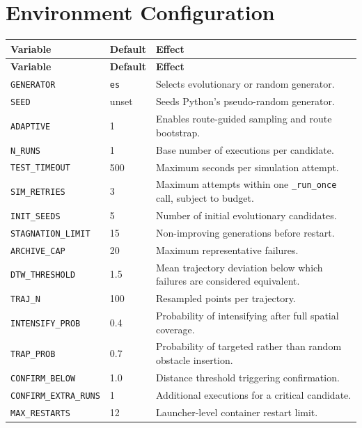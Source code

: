 \documentclass[11pt,a4paper]{report}
\newcommand{\code}[1]{\texttt{#1}}
\begin{document}
\section{Environment Configuration}
\begin{longtable}{L{3.8cm} L{2.4cm} L{8.2cm}}
\toprule
\textbf{Variable} & \textbf{Default} & \textbf{Effect}\\
\midrule
\endfirsthead
\toprule
\textbf{Variable} & \textbf{Default} & \textbf{Effect}\\
\midrule
\endhead
\code{GENERATOR} & \code{es} & Selects evolutionary or random generator.\\
\code{SEED} & unset & Seeds Python's pseudo-random generator.\\
\code{ADAPTIVE} & 1 & Enables route-guided sampling and route bootstrap.\\
\code{N\_RUNS} & 1 & Base number of executions per candidate.\\
\code{TEST\_TIMEOUT} & 500 & Maximum seconds per simulation attempt.\\
\code{SIM\_RETRIES} & 3 & Maximum attempts within one \code{\_run\_once} call, subject to budget.\\
\code{INIT\_SEEDS} & 5 & Number of initial evolutionary candidates.\\
\code{STAGNATION\_LIMIT} & 15 & Non-improving generations before restart.\\
\code{ARCHIVE\_CAP} & 20 & Maximum representative failures.\\
\code{DTW\_THRESHOLD} & 1.5 & Mean trajectory deviation below which failures are considered equivalent.\\
\code{TRAJ\_N} & 100 & Resampled points per trajectory.\\
\code{INTENSIFY\_PROB} & 0.4 & Probability of intensifying after full spatial coverage.\\
\code{TRAP\_PROB} & 0.7 & Probability of targeted rather than random obstacle insertion.\\
\code{CONFIRM\_BELOW} & 1.0 & Distance threshold triggering confirmation.\\
\code{CONFIRM\_EXTRA\_RUNS} & 1 & Additional executions for a critical candidate.\\
\code{MAX\_RESTARTS} & 12 & Launcher-level container restart limit.\\
\bottomrule
\end{longtable}
\end{document}

